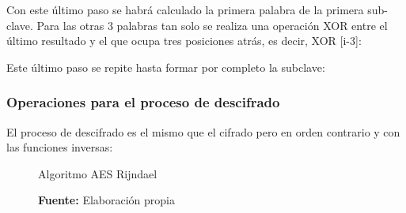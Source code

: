 \documentclass[../main/main.tex]{subfiles}
\begin{document}
\begin{enumerate}[label=\textbf{\arabic*}.]
          Con este último paso se habrá calculado la primera palabra de la primera sub-clave. Para las otras 3 palabras tan solo se realiza una operación XOR entre el último resultado y el que ocupa tres posiciones atrás, es decir, XOR [i-3]:
          
          \begin{table}[H]
            \centering
            
          \end{table}

          Este último paso se repite hasta formar por completo la subclave:

          
      \end{enumerate}

    \subsubsection{Operaciones para el proceso de descifrado}
      El proceso de descifrado es el mismo que el cifrado pero en orden contrario y con las funciones inversas:

      \begin{figure}[H]
        \centering
        \caption{Algoritmo AES Rijndael}
        
        \caption*{\textbf{Fuente:} Elaboración propia}
      \end{figure}
\end{document}
